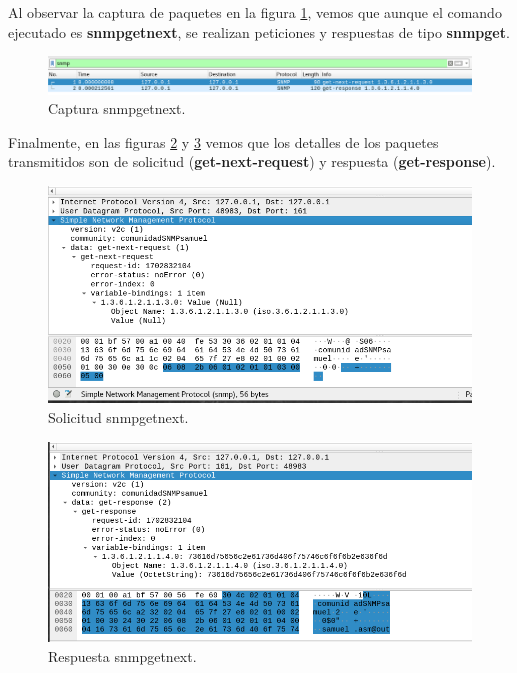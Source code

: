 Al observar la captura de paquetes en la figura \ref{image:snmpgetnext2}, vemos que aunque el comando ejecutado es \textbf{snmpgetnext}, se realizan peticiones y respuestas de tipo \textbf{snmpget}.

\FloatBarrier
\begin{figure}[htbp!]
		\centering
			\includegraphics[width=.9 \textwidth]{images/snmpgetnext2}
		\caption{Captura snmpgetnext.}
		\label{image:snmpgetnext2}
\end{figure}
\FloatBarrier

Finalmente, en las figuras \ref{image:snmpgetnext3} y \ref{image:snmpgetnext4} vemos que los detalles de los paquetes transmitidos son de solicitud (\textbf{get-next-request}) y respuesta (\textbf{get-response}). 

\FloatBarrier
\begin{figure}[htbp!]
		\centering
			\includegraphics[width=.9 \textwidth]{images/snmpgetnext3}
		\caption{Solicitud snmpgetnext.}
		\label{image:snmpgetnext3}
\end{figure}
\FloatBarrier

\FloatBarrier
\begin{figure}[htbp!]
		\centering
			\includegraphics[width=.9 \textwidth]{images/snmpgetnext4}
		\caption{Respuesta snmpgetnext.}
		\label{image:snmpgetnext4}
\end{figure}
\FloatBarrier


